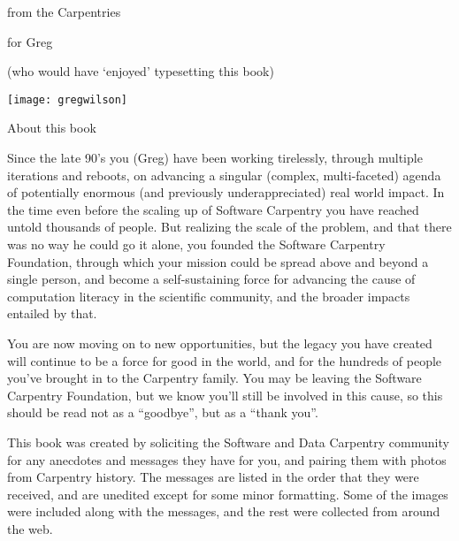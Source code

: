 %
%
% 
%
\newcommand{\signed}[1]{\par\hfill\normalfont--- \textit{#1}}

\newpage

\vspace*{1in}
\begin{center}
{\Large from the Carpentries} 

{\LARGE for Greg}

{\large (who would have `enjoyed' typesetting this book)}

\vspace*{0.5in}

\texttt{[image: gregwilson]}
\end{center}
\newpage

\vspace*{1in}
{\LARGE About this book}

Since the late 90's you (Greg) have been working tirelessly, through multiple
iterations and reboots, on advancing a singular (complex, multi-faceted) agenda
of potentially enormous (and previously underappreciated) real world impact.
In the time even before the scaling up of Software Carpentry you have reached
untold thousands of people.  But realizing the scale of the problem, and that
there was no way he could go it alone, you founded the Software Carpentry
Foundation, through which your mission could be spread above and beyond a
single person, and become a self-sustaining force for advancing the cause of
computation literacy in the scientific community, and the broader impacts
entailed by that.

You are now moving on to new opportunities, but the legacy you have created
will continue to be a force for good in the world, and for the hundreds of
people you've brought in to the Carpentry family.  You may be leaving the
Software Carpentry Foundation, but we know you'll still be involved in this
cause, so this should be read not as a ``goodbye'', but as a ``thank you''.

This book was created by soliciting the Software and Data Carpentry community
for any anecdotes and messages they have for you, and pairing them with photos
from Carpentry history.  The messages are listed in the order that they were
received, and are unedited except for some minor formatting.  Some of the
images were included along with the messages, and the rest were collected from
around the web.

